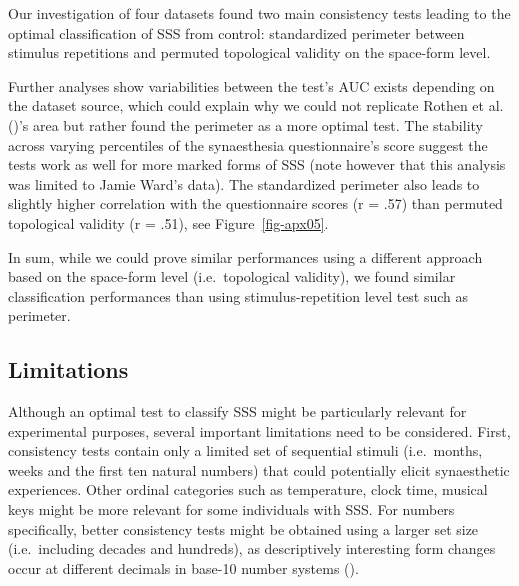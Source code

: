 \documentclass[
  man,
  floatsintext,
  longtable,
  a4paper,
  nolmodern,
  notxfonts,
  notimes,
  colorlinks=true,linkcolor=blue,citecolor=blue,urlcolor=blue]{apa7}
\begin{document}

Our investigation of four datasets found two main consistency tests
leading to the optimal classification of SSS from control: standardized
perimeter between stimulus repetitions and permuted topological validity
on the space-form level.

Further analyses show variabilities between the test's AUC exists
depending on the dataset source, which could explain why we could not
replicate Rothen et al. ()'s area but
rather found the perimeter as a more optimal test. The stability across
varying percentiles of the synaesthesia questionnaire's score suggest
the tests work as well for more marked forms of SSS (note however that
this analysis was limited to Jamie Ward's data). The standardized
perimeter also leads to slightly higher correlation with the
questionnaire scores (r = .57) than permuted topological validity (r =
.51), see Figure~\ref{fig-apx05}.

In sum, while we could prove similar performances using a different
approach based on the space-form level (i.e.~topological validity), we
found similar classification performances than using stimulus-repetition
level test such as perimeter.

\subsection{Limitations}\label{sec-limitations}

Although an optimal test to classify SSS might be particularly relevant
for experimental purposes, several important limitations need to be
considered. First, consistency tests contain only a limited set of
sequential stimuli (i.e.~months, weeks and the first ten natural
numbers) that could potentially elicit synaesthetic experiences. Other
ordinal categories such as temperature, clock time, musical keys might
be more relevant for some individuals with SSS. For numbers
specifically, better consistency tests might be obtained using a larger
set size (i.e.~including decades and hundreds), as descriptively
interesting form changes occur at different decimals in base-10 number
systems ().
\end{document}
